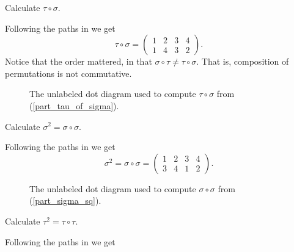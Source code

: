 \begin{exam}
\begin{apart}
\begin{soln}
\begin{figure}[hbtp]
                    \end{figure}
                    \end{soln}
                \item \label{part_tau_of_sigma} Calculate $\tau \circ \sigma$.
                    \begin{soln}
                        Following the paths in  we get 
                        $$\tau \circ \sigma = \left ( \begin{array} {cccc} 1 & 2 & 3 & 4 \\ 1 & 4 & 3 & 2 \end{array} \right ).$$
                Notice that the order mattered, in that $\sigma \circ \tau \ne \tau \circ \sigma$.  That is, composition of permutations is not commutative.
                    \begin{figure}[hbtp]
                        \centering
                        
                        \caption{The unlabeled dot diagram used to compute $\tau \circ \sigma$ from  (\ref{part_tau_of_sigma}).}
                        \label{fig_tau_of_sigma}
                    \end{figure}
                    \end{soln}
                \item \label{part_sigma_sq} Calculate $\sigma^2=\sigma \circ \sigma$.
                    \begin{soln}
                        Following the paths in  we get 
                        $$\sigma^2=\sigma \circ \sigma = \left ( \begin{array} {cccc} 1 & 2 & 3 & 4 \\ 3 & 4 & 1 & 2 \end{array} \right ).$$
                    \begin{figure}[hbtp]
                        \centering
                        
                        \caption{The unlabeled dot diagram used to compute $\sigma \circ \sigma$ from  (\ref{part_sigma_sq}).}
                        \label{fig_sigma_sq}
                    \end{figure}
                    \end{soln}
                \item \label{part_tau_sq} Calculate $\tau^2=\tau \circ \tau$.
                    \begin{soln}
                        Following the paths in  we get 

\end{soln}
\end{apart}
\end{exam}
